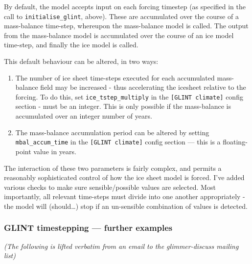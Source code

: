 By default, the model accepts input on each forcing timestep (as specified in 
the call to \texttt{initialise\_glint}, above). These are accumulated over the course 
of a mass-balance time-step, whereupon the mass-balance model is called. The 
output from the mass-balance model is accumulated over the course of an ice 
model time-step, and finally the ice model is called.

This default behaviour can be altered, in two ways:
\begin{enumerate}
\item The number of ice sheet time-steps executed for each accumulated 
mass-balance field may be increased - thus accelerating the icesheet relative 
to the forcing. To do this, set \texttt{ice\_tstep\_multiply} in the \texttt{[GLINT climate]} 
config section - must be an integer. This is only possible if the 
mass-balance is accumulated over an integer number of years.
\item The mass-balance accumulation period can be altered by setting  
\texttt{mbal\_accum\_time} in the \texttt{[GLINT climate]} config section --- this is a 
floating-point value in years.
\end{enumerate}

The interaction of these two parameters is fairly complex, and permits a 
reasonably sophisticated control of how the ice sheet model is forced. I've 
added various checks to make sure sensible/possible values are selected. Most 
importantly, all relevant time-steps must divide into one another 
appropriately - the model will (should\ldots) stop if an un-sensible combination 
of values is detected.

\subsubsection{GLINT timestepping --- further examples}

\emph{(The following is lifted verbatim from an email to the glimmer-discuss
mailing list)}

